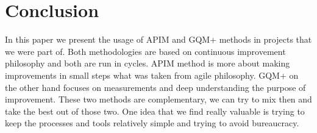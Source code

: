 \section{Conclusion}

In this paper we present the usage of APIM and GQM+ methods in projects that we were part of. Both methodologies are based on continuous improvement philosophy and both are run in cycles. APIM method is more about making improvements in small steps what was taken from agile philosophy. GQM+ on the other hand focuses on measurements and deep understanding the purpose of improvement. These two methods are complementary, we can try to mix then and take the best out of those two. One idea that we find really valuable is trying to keep the processes and tools relatively simple and trying to avoid bureaucracy.

